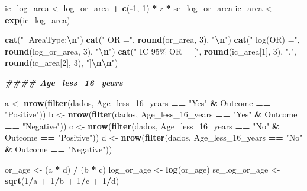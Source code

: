 \documentclass[
]{article}
\newenvironment{Shaded}{\begin{snugshade}}{\end{snugshade}}
\newcommand{\DecValTok}[1]{\textcolor[rgb]{0.00,0.00,0.81}{#1}}
\newcommand{\DocumentationTok}[1]{\textcolor[rgb]{0.56,0.35,0.01}{\textbf{\textit{#1}}}}
\newcommand{\FunctionTok}[1]{\textcolor[rgb]{0.13,0.29,0.53}{\textbf{#1}}}
\newcommand{\NormalTok}[1]{#1}
\newcommand{\OtherTok}[1]{\textcolor[rgb]{0.56,0.35,0.01}{#1}}
\newcommand{\SpecialCharTok}[1]{\textcolor[rgb]{0.81,0.36,0.00}{\textbf{#1}}}
\newcommand{\StringTok}[1]{\textcolor[rgb]{0.31,0.60,0.02}{#1}}
\begin{document}
\begin{Shaded}
\begin{Highlighting}[]
\NormalTok{ic\_log\_area }\OtherTok{\textless{}{-}}\NormalTok{ log\_or\_area }\SpecialCharTok{+} \FunctionTok{c}\NormalTok{(}\SpecialCharTok{{-}}\DecValTok{1}\NormalTok{, }\DecValTok{1}\NormalTok{) }\SpecialCharTok{*}\NormalTok{ z }\SpecialCharTok{*}\NormalTok{ se\_log\_or\_area}
\NormalTok{ic\_area }\OtherTok{\textless{}{-}} \FunctionTok{exp}\NormalTok{(ic\_log\_area)}

\FunctionTok{cat}\NormalTok{(}\StringTok{"🔹 AreaType:}\SpecialCharTok{\textbackslash{}n}\StringTok{"}\NormalTok{)}
\FunctionTok{cat}\NormalTok{(}\StringTok{"  OR ="}\NormalTok{, }\FunctionTok{round}\NormalTok{(or\_area, }\DecValTok{3}\NormalTok{), }\StringTok{"}\SpecialCharTok{\textbackslash{}n}\StringTok{"}\NormalTok{)}
\FunctionTok{cat}\NormalTok{(}\StringTok{"  log(OR) ="}\NormalTok{, }\FunctionTok{round}\NormalTok{(log\_or\_area, }\DecValTok{3}\NormalTok{), }\StringTok{"}\SpecialCharTok{\textbackslash{}n}\StringTok{"}\NormalTok{)}
\FunctionTok{cat}\NormalTok{(}\StringTok{"  IC 95\% OR = ["}\NormalTok{, }\FunctionTok{round}\NormalTok{(ic\_area[}\DecValTok{1}\NormalTok{], }\DecValTok{3}\NormalTok{), }\StringTok{","}\NormalTok{, }\FunctionTok{round}\NormalTok{(ic\_area[}\DecValTok{2}\NormalTok{], }\DecValTok{3}\NormalTok{), }\StringTok{"]}\SpecialCharTok{\textbackslash{}n\textbackslash{}n}\StringTok{"}\NormalTok{)}

\DocumentationTok{\#\#\#\# Age\_less\_16\_years }

\NormalTok{a }\OtherTok{\textless{}{-}} \FunctionTok{nrow}\NormalTok{(}\FunctionTok{filter}\NormalTok{(dados, Age\_less\_16\_years }\SpecialCharTok{==} \StringTok{"Yes"} \SpecialCharTok{\&}\NormalTok{ Outcome }\SpecialCharTok{==} \StringTok{"Positive"}\NormalTok{))}
\NormalTok{b }\OtherTok{\textless{}{-}} \FunctionTok{nrow}\NormalTok{(}\FunctionTok{filter}\NormalTok{(dados, Age\_less\_16\_years }\SpecialCharTok{==} \StringTok{"Yes"} \SpecialCharTok{\&}\NormalTok{ Outcome }\SpecialCharTok{==} \StringTok{"Negative"}\NormalTok{))}
\NormalTok{c }\OtherTok{\textless{}{-}} \FunctionTok{nrow}\NormalTok{(}\FunctionTok{filter}\NormalTok{(dados, Age\_less\_16\_years }\SpecialCharTok{==} \StringTok{"No"} \SpecialCharTok{\&}\NormalTok{ Outcome }\SpecialCharTok{==} \StringTok{"Positive"}\NormalTok{))}
\NormalTok{d }\OtherTok{\textless{}{-}} \FunctionTok{nrow}\NormalTok{(}\FunctionTok{filter}\NormalTok{(dados, Age\_less\_16\_years }\SpecialCharTok{==} \StringTok{"No"} \SpecialCharTok{\&}\NormalTok{ Outcome }\SpecialCharTok{==} \StringTok{"Negative"}\NormalTok{))}

\NormalTok{or\_age }\OtherTok{\textless{}{-}}\NormalTok{ (a }\SpecialCharTok{*}\NormalTok{ d) }\SpecialCharTok{/}\NormalTok{ (b }\SpecialCharTok{*}\NormalTok{ c)}
\NormalTok{log\_or\_age }\OtherTok{\textless{}{-}} \FunctionTok{log}\NormalTok{(or\_age)}
\NormalTok{se\_log\_or\_age }\OtherTok{\textless{}{-}} \FunctionTok{sqrt}\NormalTok{(}\DecValTok{1}\SpecialCharTok{/}\NormalTok{a }\SpecialCharTok{+} \DecValTok{1}\SpecialCharTok{/}\NormalTok{b }\SpecialCharTok{+} \DecValTok{1}\SpecialCharTok{/}\NormalTok{c }\SpecialCharTok{+} \DecValTok{1}\SpecialCharTok{/}\NormalTok{d)}


\end{Highlighting}
\end{Shaded}
\end{document}
